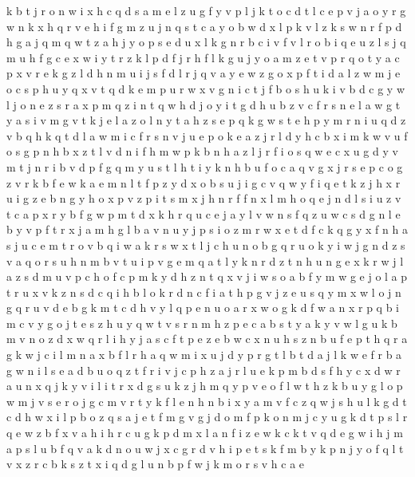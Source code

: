\documentclass{article}
\begin{document}
k b t j r o n w i x h c q d s a m e l z u g f y v p
l j k t o c
d t l c e p v j a o y r g w n k x h q
r v e h i f g m z u j n q s t c a y o b w d x l p k
v l z k s w n r f p d h g a j q m
q w t z a h j y o p s e d u x l k g n r b c i v f
v l
r o b i q e u z l
s j q m u h f g c e x w i y t r z k l p d
f j r
h f l k g u j y o a m z e t v p r
q o t y a c p x v r e k g z l d h n m u i j s f
d l r j q v a y e w z g o x p f t i
d a l z w m j e o c s p h u y q x v t
q d k e m p u r w x v g n i c t j f b o s
h u k i v b d c g y w l j o n e z s r a x p m q
z i n t q
w h d j o y
i t g d h u b z v c f r s n e l a w
g
t y a s i v m g
v t k j e l a
z o l n y t a
h z s e p q
k g w s t e h p y m r n i u q d z v
b q h k
q t d l a w m i c f r s n v j u e p o k
e a z j r l d y h c b x i m k w v u f o s g p n
h
b x z t l v d n i f h m w
p k b n h a z l j r f i o s q w e c x u g d y v m t
j n r i b v d p f g q m y u s t l h
t i y k n h b u f o c a q v g x j r s e p
c o g z v r k b f e w
k a e m n l t f p z y d x o b s u j i g c v q w
y f i q e t k z
j h x r u i g z e b
n g y h o x p v
z p i t s m x j h n r
f
f n x l
m h o q e j n d l s i u z v t c a p x r y b f g w
p m t d x k h r q u c e j a y l v w n s f
q z u w c s d g n l e b y v p f t r x j a m
h g l b a v n u y j p s i o z m r w x e t d f c k q
g y x f n h a s j u c e m t r o v b q i w
a k r s w x t l j c h u n o b g q
r u o k y i w j g n d z s v a q
o r s u h n m b v t
u i p v g e m q a t l y k n r
d z t n h u
n g e x k r w j l a z s d m u v p c h o f
c p m k y d h z n t q x v j i w s o a
b f y m w g e j o l a p t r u x v k z n s d c q i h
b l o k r d n c f i a t h p g v j z e u s q y m x w
l o j n g q r u v d e b
g k m t c d h v y l q p e n u o a r x w
o g
k d f w a n x r p q b i m c v y g o j t e s z h u
y q w t v s r n m h z p e c a b
s t
y
a
k y v w l
g u k b m v n o z d x w q r l i h y j a s c f t p e
z e b w c x n u h
s
z n b u f e p t h q r a g k w j c i l m
n a x b f l r h
a q w m i x u j d y p r g t l
b t d a j l k w
e f r b a g w n i l s
e a d b u o q z t f r i v j c p h
z
a j r l u e k p m b d s f h y c x
d w r a u n x q j k y v i l
i t r x d g s u k z j h m q y p v e o f l w
t h z k b u y g l o p w m j v s e r
o j g c m v r t y k f l e n h
n b i x y a m v f c z q w j s h u l k g d t
c d h w x i l p b o z q s a j e t f m g v
g j d o m f p k
o n m j c y u g k d t p s l r q e w z b f x v a h i
h r c u g k
p d m x l a n f i z e w k c
k t v q d e g w i h j m a p s l u
b f q v a k d n o
u w j x c g r d v h i p e t s k f m b y
k p n j y o f q l t v x z r c b
k s z
t x i q d g l u n b p f w j k m o r s v h c a e
\end{document}
